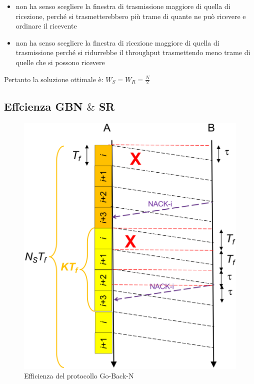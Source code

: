 \begin{itemize}
    \item non ha senso scegliere la finestra di
trasmissione maggiore di quella di ricezione, perché si
trasmetterebbero più trame di quante ne può ricevere e
ordinare il ricevente
    \item  non ha senso scegliere la finestra di
ricezione maggiore di quella di trasmissione perché si
ridurrebbe il throughput trasmettendo meno trame di quelle
che si possono ricevere
\end{itemize}
Pertanto la soluzione ottimale è: $W_S = W_R = \frac{N}{2}$
\subsection{Effcienza GBN $\&$ SR}
\begin{figure}[htbp]
    \centering
    \begin{minipage}{0.4\textwidth}
        \includegraphics[width=\linewidth]{images/efficienzagbn.png}
        \caption{Efficienza del protocollo Go-Back-N}
    \end{minipage}%
    \hfill
    \begin{minipage}{0.5\textwidth}

\end{minipage}
\end{figure}
